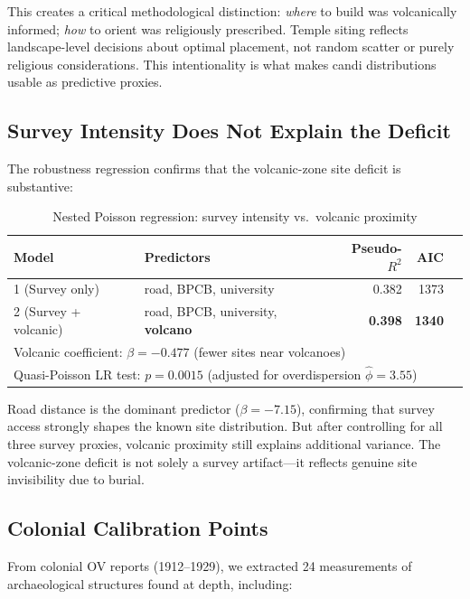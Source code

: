 \documentclass[12pt,a4paper]{article}
\begin{document}
This creates a critical methodological distinction: \emph{where} to build was volcanically informed; \emph{how} to orient was religiously prescribed. Temple siting reflects landscape-level decisions about optimal placement, not random scatter or purely religious considerations. This intentionality is what makes candi distributions usable as predictive proxies.

\subsection{Survey Intensity Does Not Explain the Deficit}
\label{sec:adv3results}

The robustness regression confirms that the volcanic-zone site deficit is substantive:

\begin{table}[h]
\centering
\caption{Nested Poisson regression: survey intensity vs.\ volcanic proximity}
\begin{tabular}{llrrr}
\toprule
Model & Predictors & Pseudo-$R^2$ & AIC & \\
\midrule
1 (Survey only) & road, BPCB, university & 0.382 & 1373 & \\
2 (Survey + volcanic) & road, BPCB, university, \textbf{volcano} & \textbf{0.398} & \textbf{1340} & \\
\midrule
\multicolumn{4}{l}{Volcanic coefficient: $\beta=-0.477$ (fewer sites near volcanoes)} \\
\multicolumn{4}{l}{Quasi-Poisson LR test: $p=0.0015$ (adjusted for overdispersion $\hat{\phi}=3.55$)} \\
\bottomrule
\end{tabular}
\label{tab:adv3}
\end{table}

Road distance is the dominant predictor ($\beta=-7.15$), confirming that survey access strongly shapes the known site distribution. But after controlling for all three survey proxies, volcanic proximity still explains additional variance. The volcanic-zone deficit is not solely a survey artifact---it reflects genuine site invisibility due to burial.

\subsection{Colonial Calibration Points}
\label{sec:validation}

From colonial OV reports (1912--1929), we extracted 24 measurements of archaeological structures found at depth, including:
\end{document}
